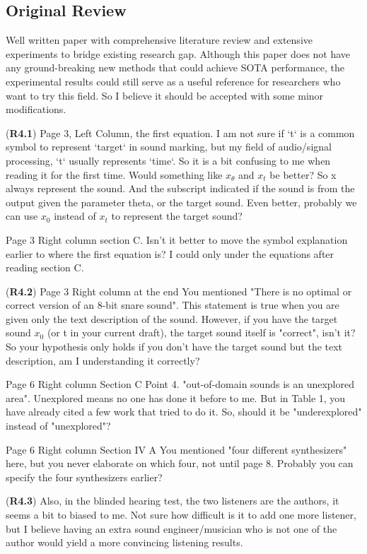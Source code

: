 \documentclass[11pt]{article}
\begin{document}
\subsection{Original Review}
Well written paper with comprehensive literature review and extensive experiments to bridge existing research gap. Although this paper does not have any ground-breaking new methods that could achieve SOTA performance, the experimental results could still serve as a useful reference for researchers who want to try this field. So I believe it should be accepted with some minor modifications.

(\textbf{R4.1}) Page 3, Left Column, the first equation.
I am not sure if `t` is a common symbol to represent `target` in sound marking, but my field of audio/signal processing, `t` usually represents `time`. So it is a bit confusing to me when reading it for the first time.
Would something like $x_\theta$ and $x_t$ be better? So x always represent the sound. And the subscript indicated if the sound is from the output given the parameter theta, or the target sound. Even better, probably we can use $x_0$ instead of $x_t$ to represent the target sound?

Page 3 Right column section C.
Isn't it better to move the symbol explanation earlier to where the first equation is? I could only under the equations after reading section C.

(\textbf{R4.2}) Page 3 Right column at the end
You mentioned "There is no optimal or correct version of an 8-bit snare sound".
This statement is true when you are given only the text description of the sound. However, if you have the target sound $x_0$ (or t in your current draft), the target sound itself is "correct", isn't it? So your hypothesis only holds if you don't have the target sound but the text description, am I understanding it correctly?

Page 6 Right column Section C Point 4.
"out-of-domain sounds is an unexplored area". Unexplored means no one has done it before to me. But in Table 1, you have already cited a few work that tried to do it. So, should it be "underexplored" instead of "unexplored"?


Page 6 Right column Section IV A
You mentioned "four different synthesizers" here, but you never elaborate on which four, not until page 8. Probably you can specify the four synthesizers earlier?

(\textbf{R4.3}) Also, in the blinded hearing test, the two listeners are the authors, it seems a bit to biased to me. Not sure how difficult is it to add one more listener, but I believe having an extra sound engineer/musician who is not one of the author would yield a more convincing listening results.
\end{document}
